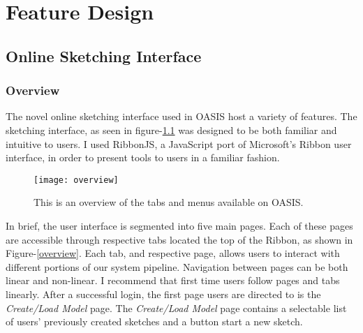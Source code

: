 \chapter{Feature Design} \label{sec:feature}

\section{Online Sketching Interface}

	\subsection{Overview}


		The novel online sketching interface used in OASIS host a variety of features.
		The sketching interface, as seen in figure-\ref{fig:overview} was designed to be both familiar and intuitive to users.
		I used RibbonJS, a JavaScript port of Microsoft's Ribbon user interface, in order to present tools to users in a familiar fashion\cite{Dostal}. 

		\begin{figure}[h]
		\centering
		\texttt{[image: overview]}
		\caption{This is an overview of the tabs and menus available on OASIS.}
		\label{fig:overview}
		\end{figure}

		In brief, the user interface is segmented into five main pages. 
		Each of these pages are accessible through respective tabs located the top of the Ribbon, as shown in Figure-\ref{overview}.
		Each tab, and respective page, allows users to interact with different portions of our system pipeline.
		Navigation between pages can be both linear and non-linear. 
		I recommend that first time users follow pages and tabs linearly. 
		After a successful login, the first page users are directed to is the \textit{Create/Load Model} page.
		The \textit{Create/Load Model} page contains a selectable list of users' previously created sketches and a button start a new sketch.\\

